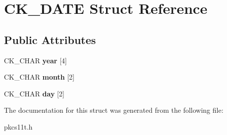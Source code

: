 \hypertarget{struct_c_k___d_a_t_e}{}\section{C\+K\+\_\+\+D\+A\+TE Struct Reference}
\label{struct_c_k___d_a_t_e}
\subsection*{Public Attributes}
\begin{DoxyCompactItemize}
\item 
\mbox{\label{struct_c_k___d_a_t_e_a223a9ead1aa935845bea0e9426317131}} 
C\+K\+\_\+\+C\+H\+AR {\bfseries year} \mbox{[}4\mbox{]}
\item 
\mbox{\label{struct_c_k___d_a_t_e_adbc049ebf70a76bb11c7b44dc6c82654}} 
C\+K\+\_\+\+C\+H\+AR {\bfseries month} \mbox{[}2\mbox{]}
\item 
\mbox{\label{struct_c_k___d_a_t_e_ae753815abaa535dbca99dfe3a079cb8a}} 
C\+K\+\_\+\+C\+H\+AR {\bfseries day} \mbox{[}2\mbox{]}
\end{DoxyCompactItemize}


The documentation for this struct was generated from the following file\+:\begin{DoxyCompactItemize}
\item 
pkcs11t.\+h\end{DoxyCompactItemize}
